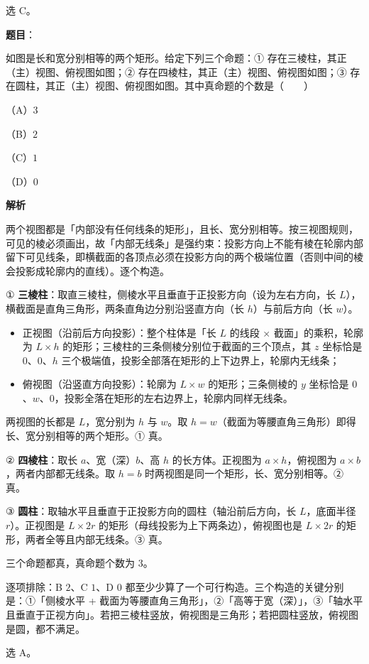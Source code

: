 \begin{answer}
选 C。


\end{answer}
\begin{answer}

\textbf{题目}：

如图是长和宽分别相等的两个矩形。给定下列三个命题：① 存在三棱柱，其正（主）视图、俯视图如图；② 存在四棱柱，其正（主）视图、俯视图如图；③ 存在圆柱，其正（主）视图、俯视图如图。其中真命题的个数是\mbox{（　　）}

（A）$3$

（B）$2$

（C）$1$

（D）$0$
\nopagebreak[4]
\begin{center}\end{center}
\nopagebreak[4]
\textbf{解析}

两个视图都是「内部没有任何线条的矩形」，且长、宽分别相等。按三视图规则，可见的棱必须画出，故「内部无线条」是强约束：投影方向上不能有棱在轮廓内部留下可见线条，即横截面的各顶点必须在投影方向的两个极端位置（否则中间的棱会投影成轮廓内的直线）。逐个构造。

① \textbf{三棱柱}：取直三棱柱，侧棱水平且垂直于正投影方向（设为左右方向，长 $L$），横截面是直角三角形，两条直角边分别沿竖直方向（长 $h$）与前后方向（长 $w$）。

\begin{itemize}
\item 正视图（沿前后方向投影）：整个柱体是「长 $L$ 的线段 × 截面」的乘积，轮廓为 $L\times h$ 的矩形；三棱柱的三条侧棱分别位于截面的三个顶点，其 $z$ 坐标恰是 $0$、$0$、$h$ 三个极端值，投影全部落在矩形的上下边界上，轮廓内无线条；
\item 俯视图（沿竖直方向投影）：轮廓为 $L\times w$ 的矩形；三条侧棱的 $y$ 坐标恰是 $0$、$w$、$0$，投影全落在矩形的左右边界上，轮廓内同样无线条。
\end{itemize}

两视图的长都是 $L$，宽分别为 $h$ 与 $w$。取 $h=w$（截面为等腰直角三角形）即得长、宽分别相等的两个矩形。① 真。

② \textbf{四棱柱}：取长 $a$、宽（深）$b$、高 $h$ 的长方体。正视图为 $a\times h$，俯视图为 $a\times b$，两者内部都无线条。取 $h=b$ 时两视图是同一个矩形，长、宽分别相等。② 真。

③ \textbf{圆柱}：取轴水平且垂直于正投影方向的圆柱（轴沿前后方向，长 $L$，底面半径 $r$）。正视图是 $L\times2r$ 的矩形（母线投影为上下两条边），俯视图也是 $L\times2r$ 的矩形，两者全等且内部无线条。③ 真。

三个命题都真，真命题个数为 $3$。

逐项排除：B $2$、C $1$、D $0$ 都至少少算了一个可行构造。三个构造的关键分别是：①「侧棱水平 + 截面为等腰直角三角形」，②「高等于宽（深）」，③「轴水平且垂直于正视方向」。若把三棱柱竖放，俯视图是三角形；若把圆柱竖放，俯视图是圆，都不满足。

选 A。


\end{answer}
